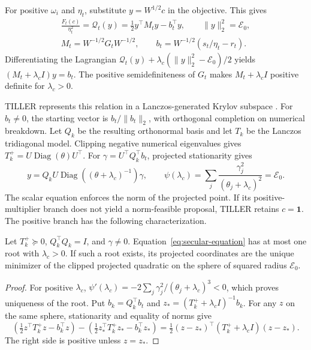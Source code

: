For positive $\omega_i$ and $\eta_t$, substitute $y=W^{1/2}c$
in the objective. This gives
\begin{equation}
 \begin{gathered}
 \frac{F_t(c)}{\eta_t^2}
 =\mathcal Q_t(y)=\tfrac12 y^\top M_ty-b_t^\top y,
 \qquad \|y\|_2^2=\mathcal E_0,\\
 M_t=W^{-1/2}G_tW^{-1/2},\qquad
 b_t=W^{-1/2}(s_t/\eta_t-r_t).
 \end{gathered}
 \label{eq:whitened-transaction}
\end{equation}
Differentiating the Lagrangian
$\mathcal Q_t(y)+\lambda_c(\|y\|_2^2-\mathcal E_0)/2$
yields $(M_t+\lambda_c I)y=b_t$.
The positive semidefiniteness of $G_t$ makes $M_t+\lambda_c I$
positive definite for $\lambda_c>0$.

TILLER represents this relation in a Lanczos-generated Krylov subspace
\citep{lanczos1950iteration}. For $b_t\ne0$, the starting vector is
$b_t/\|b_t\|_2$, with orthogonal completion on numerical breakdown.
Let $Q_k$ be the resulting orthonormal basis and
let $T_k$ be the Lanczos tridiagonal model. Clipping negative
numerical eigenvalues gives $T_k^+=U\operatorname{Diag}(\theta)U^\top$.
For $\gamma=U^\top Q_k^\top b_t$, projected stationarity gives
\begin{equation}
 y=Q_kU\operatorname{Diag}((\theta+\lambda_c)^{-1})\gamma,
 \qquad
 \psi(\lambda_c)=\sum_j\frac{\gamma_j^2}{(\theta_j+\lambda_c)^2}
 =\mathcal E_0.
 \label{eq:secular-equation}
\end{equation}
The scalar equation enforces the norm of the projected point.
If its positive-multiplier branch does not yield a norm-feasible
proposal, TILLER retains $c=\boldsymbol1$.
The positive branch has the following characterization.

\begin{proposition}
\label{prop:allocation}
Let $T_k^+\succeq0$, $Q_k^\top Q_k=I$, and $\gamma\ne0$.
Equation~\ref{eq:secular-equation} has at most one root with
$\lambda_c>0$. If such a root exists, its projected coordinates are
the unique minimizer of the clipped projected quadratic on the sphere
of squared radius $\mathcal E_0$.
\end{proposition}
\begin{proof}
For positive $\lambda_c$,
$\psi'(\lambda_c)=-2\sum_j\gamma_j^2/(\theta_j+\lambda_c)^3<0$,
which proves uniqueness of the root. Put $b_k=Q_k^\top b_t$ and
$z_*=(T_k^++\lambda_c I)^{-1}b_k$.
For any $z$ on the same sphere, stationarity and equality of norms give
\begin{equation}
 \left(\tfrac12z^\top T_k^+z-b_k^\top z\right)
 -\left(\tfrac12z_*^\top T_k^+z_*-b_k^\top z_*\right)
 =\tfrac12(z-z_*)^\top(T_k^++\lambda_c I)(z-z_*).
 \label{eq:projected-model-difference}
\end{equation}
The right side is positive unless $z=z_*$.
\end{proof}

